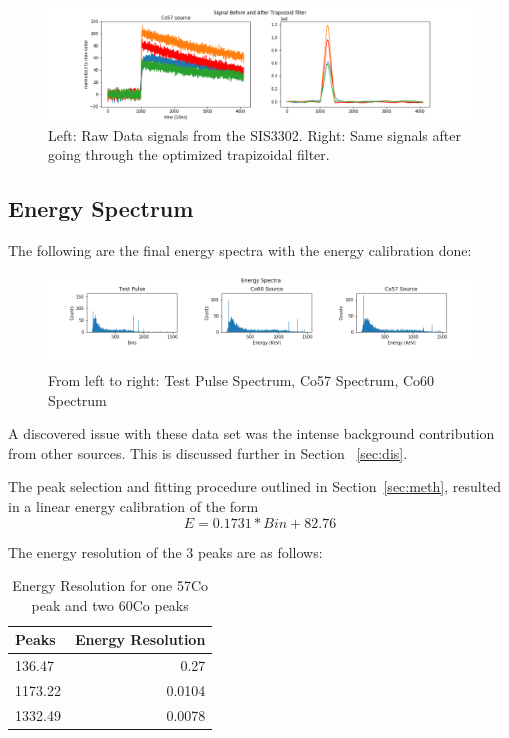 \begin{figure}[!htb]
\centering
\includegraphics[width=1.0\linewidth]{images/5signals_3.png}
\caption{ Left: Raw Data signals from the SIS3302. Right: Same signals after going through the optimized trapizoidal filter.}
\label{fig:signals}
\end{figure}


\subsection{Energy Spectrum}
The following are the final energy spectra with the energy calibration done:

\begin{figure}[!htb]
\centering
\includegraphics[width=1.0\linewidth]{images/BinnedData_3_energy.png}
\caption{ From left to right: Test Pulse Spectrum, Co57 Spectrum, Co60 Spectrum}
\label{fig:EngSpec}
\end{figure}




A discovered issue with these data set was the intense background contribution from other sources. This is discussed further in Section ~\ref{sec:dis}.


The peak selection and fitting procedure outlined in Section~\ref{sec:meth}, resulted in a linear energy calibration of the form
\begin{equation}
E = 0.1731*Bin + 82.76
\end{equation}


The energy resolution of the 3 peaks are as follows:


\begin{table}[H]
        \begin{center}
                \begin{tabular}{l|r}
                        \textbf{Peaks} & \textbf{Energy Resolution}\\
                        \hline
                        136.47      &       0.27     \\
                        1173.22     &       0.0104   \\
			1332.49     &       0.0078   \\ 
                \end{tabular}
                \caption{Energy Resolution for one 57Co peak and two 60Co peaks}
                \label{tab:CalSrc}
        \end{center}
\end{table}
